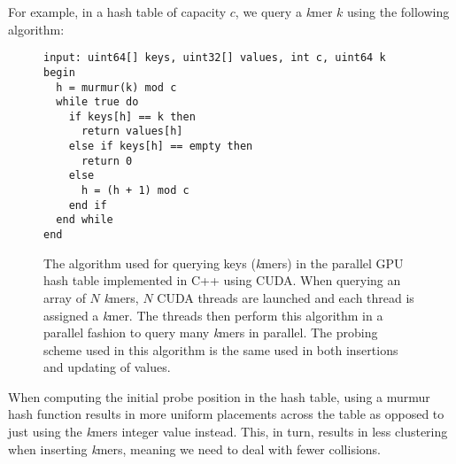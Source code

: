 For example, in a hash table of capacity $c$, we query a \textit{k}mer $k$ using the following algorithm:
\begin{figure}[H]
\begin{lstlisting}[style=pseudocode]
input: uint64[] keys, uint32[] values, int c, uint64 k
begin
  h = murmur(k) mod c
  while true do
    if keys[h] == k then
      return values[h]
    else if keys[h] == empty then
      return 0
    else
      h = (h + 1) mod c
    end if
  end while
end
\end{lstlisting}
\caption{
  The algorithm used for querying keys (\textit{k}mers) in the parallel GPU hash table implemented in C++ using CUDA. 
  When querying an array of $N$ \textit{k}mers, $N$ CUDA threads are launched and each thread is assigned a \textit{k}mer. 
  The threads then perform this algorithm in a parallel fashion to query many \textit{k}mers in parallel.
  The probing scheme used in this algorithm is the same used in both insertions and updating of values.
}
\end{figure}

When computing the initial probe position in the hash table, using a murmur hash function results in more uniform placements across the table as opposed to just using the \textit{k}mers integer value instead.
This, in turn, results in less clustering when inserting \textit{k}mers, meaning we need to deal with fewer collisions.


